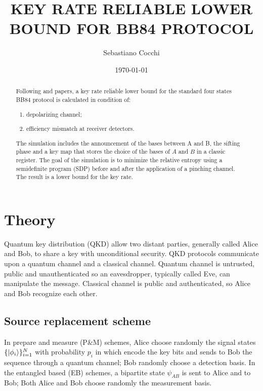 \documentclass{article}
\title{KEY RATE RELIABLE LOWER BOUND FOR BB84 PROTOCOL}
\author{Sebastiano Cocchi }
\date{\today}
\begin{document}
\maketitle

\begin{abstract}                %
    Following \cite{George_2021} and \cite{Winick2018reliablenumerical} papers, a key rate reliable lower bound for the standard four states BB84 protocol is calculated in condition of:
    \begin{enumerate}
        \item depolarizing channel;
        \item efficiency mismatch at receiver detectors.
    \end{enumerate}
    The simulation includes the announcement of the bases between A and B, the sifting phase and a key map that stores the choice of the bases of \(A\) and \(B\) in a classic register.
    The goal of the simulation is to minimize the relative entropy using a semidefinite program (SDP) before and after the application of a pinching channel.
    The result is a lower bound for the key rate.
\end{abstract}

\tableofcontents

\section{Theory}
Quantum key distribution (QKD) allow two distant parties, generally called Alice and Bob, to share a key with unconditional security.
QKD protocols communicate upon a quantum channel and a classical channel.
Quantum channel is untrusted, public and unauthenticated so an eavesdropper, typically called Eve, can manipulate the message. 
Classical channel is public and authenticated, so Alice and Bob recognize each other.
    \subsection{Source replacement scheme}
    In prepare and measure (P\&M) schemes, Alice choose randomly the signal states \(\{\ket{\phi_i}\}_{i=1}^N\) with probability \(p_i\) in which encode the key bits and sends to Bob the sequence through a quantum channel;
    Bob randomly choose a detection basis.
    In the entangled based (EB) schemes, a bipartite state \(\psi_{AB}\) is sent to Alice and to Bob; Both Alice and Bob choose randomly the measurement basis.
\end{document}
